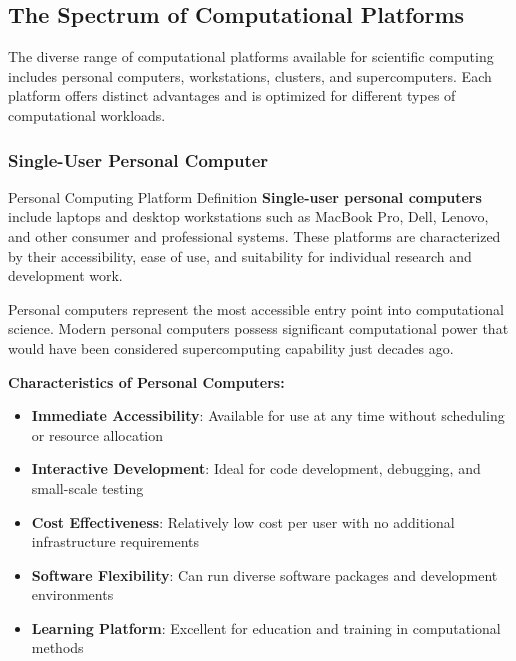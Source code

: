 \subsection{The Spectrum of Computational Platforms}

The diverse range of computational platforms available for scientific computing includes personal computers, workstations, clusters, and supercomputers. Each platform offers distinct advantages and is optimized for different types of computational workloads.

\subsubsection{Single-User Personal Computer}

\begin{conceptcard}{Personal Computing Platform Definition}
\textbf{Single-user personal computers} include laptops and desktop workstations such as MacBook Pro, Dell, Lenovo, and other consumer and professional systems. These platforms are characterized by their accessibility, ease of use, and suitability for individual research and development work.
\end{conceptcard}

Personal computers represent the most accessible entry point into computational science. Modern personal computers possess significant computational power that would have been considered supercomputing capability just decades ago.

\textbf{Characteristics of Personal Computers:}
\begin{itemize}
    \item \textbf{Immediate Accessibility}: Available for use at any time without scheduling or resource allocation
    \item \textbf{Interactive Development}: Ideal for code development, debugging, and small-scale testing
    \item \textbf{Cost Effectiveness}: Relatively low cost per user with no additional infrastructure requirements
    \item \textbf{Software Flexibility}: Can run diverse software packages and development environments
    \item \textbf{Learning Platform}: Excellent for education and training in computational methods
\end{itemize}


